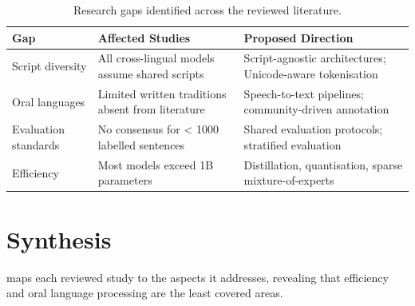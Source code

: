 \documentclass[
    language=english,
    doctype=article,
    institution=none,
    titlestyle=book,
]{../../omnilatex}
\begin{document}
\begin{table}[htbp]
\centering
\caption{Research gaps identified across the reviewed literature.}
\label{tab:gap-analysis}
\begin{tabular}{p{3cm}p{4cm}p{5cm}}
\toprule
\textbf{Gap} & \textbf{Affected Studies} & \textbf{Proposed Direction} \\
\midrule
Script diversity
    & All cross-lingual models assume shared scripts
    & Script-agnostic architectures; Unicode-aware tokenisation \\
\midrule
Oral languages
    & Limited written traditions absent from literature
    & Speech-to-text pipelines; community-driven annotation \\
\midrule
Evaluation standards
    & No consensus for < 1000 labelled sentences
    & Shared evaluation protocols; stratified evaluation \\
\midrule
Efficiency
    & Most models exceed 1B parameters
    & Distillation, quantisation, sparse mixture-of-experts \\
\bottomrule
\end{tabular}
\end{table}

\section{Synthesis}
\label{sec:synthesis}
 maps each reviewed study to the aspects it
addresses, revealing that efficiency and oral language processing are the least
covered areas.
\end{document}
